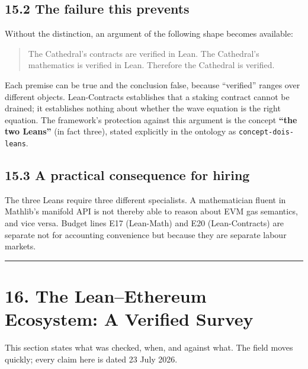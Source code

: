 \documentclass[
  11pt]{report}
\begin{document}
\hypertarget{the-failure-this-prevents}{%
\section{15.2 The failure this
prevents}\label{the-failure-this-prevents}}

Without the distinction, an argument of the following shape becomes
available:

\begin{quote}
The Cathedral's contracts are verified in Lean. The Cathedral's
mathematics is verified in Lean. Therefore the Cathedral is verified.
\end{quote}

Each premise can be true and the conclusion false, because ``verified''
ranges over different objects. Lean-Contracts establishes that a staking
contract cannot be drained; it establishes nothing about whether the
wave equation is the right equation. The framework's protection against
this argument is the concept \textbf{``the two Leans''} (in fact three),
stated explicitly in the ontology as \texttt{concept-dois-leans}.

\hypertarget{a-practical-consequence-for-hiring}{%
\section{15.3 A practical consequence for
hiring}\label{a-practical-consequence-for-hiring}}

The three Leans require three different specialists. A mathematician
fluent in Mathlib's manifold API is not thereby able to reason about EVM
gas semantics, and vice versa. Budget lines E17 (Lean-Math) and E20
(Lean-Contracts) are separate not for accounting convenience but because
they are separate labour markets.

\begin{center}\rule{0.5\linewidth}{0.5pt}\end{center}

\hypertarget{the-leanethereum-ecosystem-a-verified-survey}{%
\chapter{16. The Lean--Ethereum Ecosystem: A Verified
Survey}\label{the-leanethereum-ecosystem-a-verified-survey}}

This section states what was checked, when, and against what. The field
moves quickly; every claim here is dated 23 July 2026.
\end{document}
